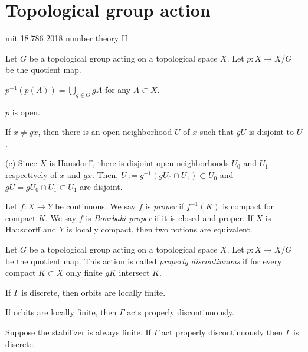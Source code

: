 \documentclass[12pt]{article}
\begin{document}
\tableofcontents
\newpage
\section{Topological group action}

mit 18.786 2018 number theory II

\begin{prb}
Let $G$ be a topological group acting on a topological space $X$.
Let $p:X\to X/G$ be the quotient map.

\begin{parts}
\item $p^{-1}(p(A))=\bigcup_{g\in G}gA$ for any $A\subset X$.
\item $p$ is open.
\item If $x\ne gx$, then there is an open neighborhood $U$ of $x$ such that $gU$ is disjoint to $U$.
\end{parts}
\end{prb}
\begin{pf}
(c)
Since $X$ is Hausdorff, there is disjoint open neighborhoods $U_0$ and $U_1$ respectively of $x$ and $gx$.
Then, $U:=g^{-1}(gU_0\cap U_1)\subset U_0$ and $gU=gU_0\cap U_1\subset U_1$ are disjoint.
\end{pf}

\begin{prb}
Let $f:X\to Y$ be continuous.
We say $f$ is \emph{proper} if $f^{-1}(K)$ is compact for compact $K$.
We say $f$ is \emph{Bourbaki-proper} if it is closed and proper.
If $X$ is Hausdorff and $Y$ is locally compact, then two notions are equivalent.
\end{prb}



\begin{prb}
Let $G$ be a topological group acting on a topological space $X$.
Let $p:X\to X/G$ be the quotient map.
This action is called \emph{properly discontinuous} if for every compact $K\subset X$ only finite $gK$ intersect $K$.
\begin{parts}
\item If $\Gamma$ is discrete, then orbits are locally finite.
\item If orbits are locally finite, then $\Gamma$ acts properly discontinuously.
\item Suppose the stabilizer is always finite. If $\Gamma$ act properly discontinuously then $\Gamma$ is discrete.
\end{parts}
\end{prb}
\end{document}
